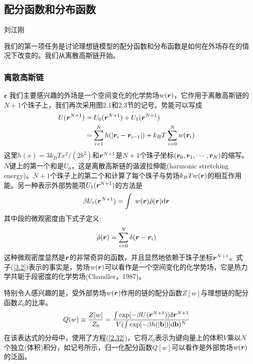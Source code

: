 \subsection{配分函数和分布函数}
\begin{center}
刘江刚
\end{center}
我们的第一项任务是讨论理想链模型的配分函数和分布函数是如何在外场存在的情况下改变的。我们从离散高斯链开始。
\subsubsection{离散高斯链}
$\bm{r}$
我们主要感兴趣的外场是一个空间变化的化学势场$w(\bm{r})$，它作用于离散高斯链的$N+1$个珠子上，我们再次采用图2.1和2.3节的记号。势能可以写成
\begin{equation}\label{3.1}
\begin{aligned}
U(\bm{r}^{N+1})&=U_0(\bm{r}^{N+1})+U_1(\bm{r}^{N+1})\\
&=\sum\limits_{i=1}^Nh(\left|\bm{r}_i-\bm{r}_{i-1}\right|)+k_BT\sum\limits_{i=0}^Nw(\bm{r}_i)
\end{aligned}
\end{equation}
这里$h(x)=3k_BTx^2/(2b^2)$和$\bm{r}^{N+1}$是$N+1$个珠子坐标$(\bm{r}_0,\bm{r}_1,\cdots,\bm{r}_N)$的缩写。$N$键上的第一个和是$U_0$，这是离散高斯链的谐波拉伸能(harmonic stretching energy)。$N+1$个珠子上的第二个和计算了每个珠子与势场$k_BTw(\bm{r})$的相互作用能。另一种表示外部势能项$U_1(\bm{r}^{N+1})$的方法是
\begin{equation}\label{3.2}
\beta U_1(\bm{r}^{N+1})=\int~w(\bm{r})\hat{\rho}(\bm{r})\mathrm{d}\bm{r}
\end{equation}
其中段的微观密度由下式子定义:
\begin{equation}\label{3.3}
\hat{\rho}(\bm{r})=\sum\limits_{i=0}^N\delta(\bm{r}-\bm{r}_i)
\end{equation}
这种微观密度显然是$\bm{r}$的非常奇异的函数，并且显然地依赖于珠子坐标$\bm{r}^{N+1}$。式子(\ref{3.2})表示的事实是，势场$w(\bm{r})$可以看作是一个空间变化的化学势场，它是热力学共轭于段密度的化学势场(Chandler，1987)。

特别令人感兴趣的是，受外部势场$w(\bm{r})$作用的链的配分函数$Z[w]$与理想链的配分函数$Z_0$的比率。
\begin{equation}\label{3.4}
Q(w)\equiv\frac{Z[w]}{Z_0}=\frac{\int\exp[-\beta U(\bm{r}^{N+1})]\mathrm{d}\bm{r}^{N+1}}{V(\int\exp[-\beta h(\left|\mathbf{b}\right|)]\mathrm{d}\mathbf{b})^N}
\end{equation}
在该表达式的分母中，使用了方程(\ref{2.32})，它将$Z_0$表示为键向量上的体积$V$乘以$N$个独立(体积)积分，如记号所示，归一化配分函数$Q[w]$可以看作是外部势场$w(\bm{r})$的泛函。

